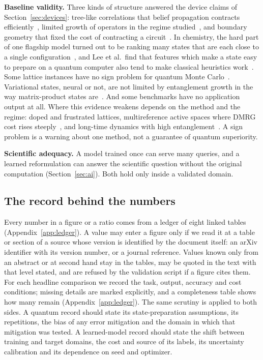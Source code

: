 \textbf{Baseline validity.} Three kinds of structure answered the device claims of Section~\ref{sec:devices}: tree-like correlations that belief propagation contracts efficiently~\cite{tindall2024}, limited growth of operators in the regime studied~\cite{begusic2024}, and boundary geometry that fixed the cost of contracting a circuit~\cite{manabe2026}. In chemistry, the hard part of one flagship model turned out to be ranking many states that are each close to a single configuration~\cite{zhai2026}, and Lee et al.\ find that features which make a state easy to prepare on a quantum computer also tend to make classical heuristics work~\cite{lee2023}. Some lattice instances have no sign problem for quantum Monte Carlo~\cite{hirsch1985}. Variational states, neural or not, are not limited by entanglement growth in the way matrix-product states are~\cite{mauron2025}. And some benchmarks have no application output at all. Where this evidence weakens depends on the method and the regime: doped and frustrated lattices, multireference active spaces where DMRG cost rises steeply~\cite{goings2022}, and long-time dynamics with high entanglement~\cite{bermejo2026}. A sign problem is a warning about one method, not a guarantee of quantum superiority.

\textbf{Scientific adequacy.} A model trained once can serve many queries, and a learned reformulation can answer the scientific question without the original computation (Section~\ref{sec:ai}). Both hold only inside a validated domain.

\subsection{The record behind the numbers}
Every number in a figure or a ratio comes from a ledger of eight linked tables (Appendix~\ref{app:ledger}). A value may enter a figure only if we read it at a table or section of a source whose version is identified by the document itself: an arXiv identifier with its version number, or a journal reference. Values known only from an abstract or at second hand stay in the tables, may be quoted in the text with that level stated, and are refused by the validation script if a figure cites them. For each headline comparison we record the task, output, accuracy and cost conditions; missing details are marked explicitly, and a completeness table shows how many remain (Appendix~\ref{app:ledger}). The same scrutiny is applied to both sides. A quantum record should state its state-preparation assumptions, its repetitions, the bias of any error mitigation and the domain in which that mitigation was tested. A learned-model record should state the shift between training and target domains, the cost and source of its labels, its uncertainty calibration and its dependence on seed and optimizer.

